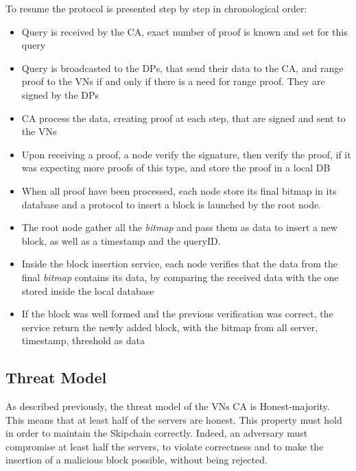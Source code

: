 \documentclass{article}
\begin{document}
To resume the protocol is presented step by step in chronological order:
\begin{itemize}
\item{Query is received by the CA, exact number of proof is known and set for this query}
\item{Query is broadcasted to the DPs, that send their data to the CA, and range proof to the VNs if and only if there is a need for range proof. They are signed by the DPs}
\item{CA process the data, creating proof at each step, that are signed and sent to the VNs}
\item{Upon receiving a proof, a node verify the signature, then verify the proof, if it was expecting more proofs of this type,  and store the proof in a local DB}
\item{When all proof have been processed, each node store its final bitmap in its database and a protocol to insert a block is launched by the root node.}
\item{The root node gather all the \textit{bitmap} and pass them as data to insert a new block, as well as a timestamp and the queryID.}
\item{Inside the block insertion service, each node verifies that the data from the final \textit{bitmap} contains its data, by comparing the received data with the one stored inside the local database}
\item{If the block was well formed and the previous verification was correct, the service return the newly added block, with the bitmap from all server, timestamp, threshold as data}
\end{itemize}
\subsection{Threat Model}
As described previously, the threat model of the VNs CA is Honest-majority. This means that at least half of the servers are honest. This property must hold in order to maintain the Skipchain correctly. Indeed, an adversary must compromise at least half the servers, to violate correctness and to make the insertion of a malicious block possible, without being rejected.
\end{document}
